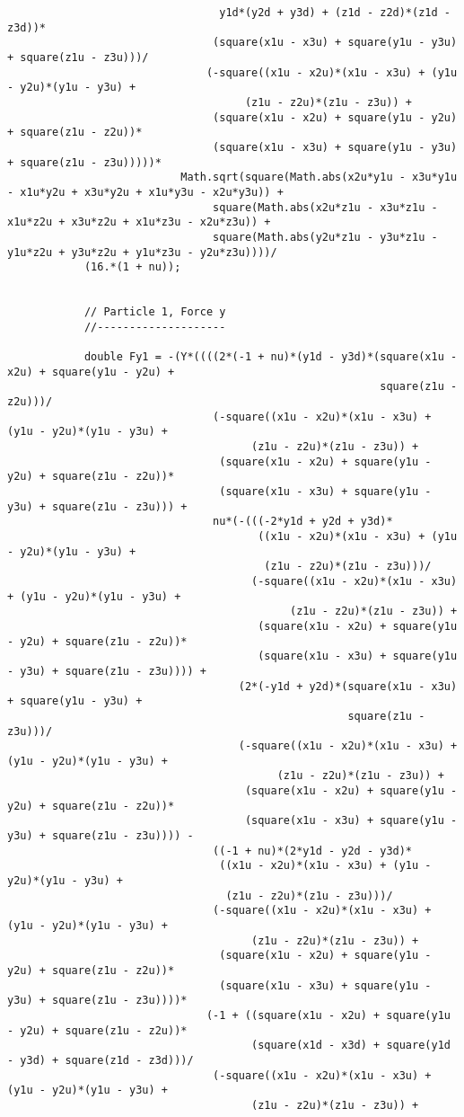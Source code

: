 \begin{lstlisting}
								 y1d*(y2d + y3d) + (z1d - z2d)*(z1d - z3d))*
								(square(x1u - x3u) + square(y1u - y3u) + square(z1u - z3u)))/
							   (-square((x1u - x2u)*(x1u - x3u) + (y1u - y2u)*(y1u - y3u) + 
									 (z1u - z2u)*(z1u - z3u)) + 
								(square(x1u - x2u) + square(y1u - y2u) + square(z1u - z2u))*
								(square(x1u - x3u) + square(y1u - y3u) + square(z1u - z3u)))))*
						   Math.sqrt(square(Math.abs(x2u*y1u - x3u*y1u - x1u*y2u + x3u*y2u + x1u*y3u - x2u*y3u)) + 
								square(Math.abs(x2u*z1u - x3u*z1u - x1u*z2u + x3u*z2u + x1u*z3u - x2u*z3u)) + 
								square(Math.abs(y2u*z1u - y3u*z1u - y1u*z2u + y3u*z2u + y1u*z3u - y2u*z3u))))/
			(16.*(1 + nu));
			
			
			// Particle 1, Force y
			//--------------------
			
			double Fy1 = -(Y*((((2*(-1 + nu)*(y1d - y3d)*(square(x1u - x2u) + square(y1u - y2u) + 
														  square(z1u - z2u)))/
								(-square((x1u - x2u)*(x1u - x3u) + (y1u - y2u)*(y1u - y3u) + 
									  (z1u - z2u)*(z1u - z3u)) + 
								 (square(x1u - x2u) + square(y1u - y2u) + square(z1u - z2u))*
								 (square(x1u - x3u) + square(y1u - y3u) + square(z1u - z3u))) + 
								nu*(-(((-2*y1d + y2d + y3d)*
									   ((x1u - x2u)*(x1u - x3u) + (y1u - y2u)*(y1u - y3u) + 
										(z1u - z2u)*(z1u - z3u)))/
									  (-square((x1u - x2u)*(x1u - x3u) + (y1u - y2u)*(y1u - y3u) + 
											(z1u - z2u)*(z1u - z3u)) + 
									   (square(x1u - x2u) + square(y1u - y2u) + square(z1u - z2u))*
									   (square(x1u - x3u) + square(y1u - y3u) + square(z1u - z3u)))) + 
									(2*(-y1d + y2d)*(square(x1u - x3u) + square(y1u - y3u) + 
													 square(z1u - z3u)))/
									(-square((x1u - x2u)*(x1u - x3u) + (y1u - y2u)*(y1u - y3u) + 
										  (z1u - z2u)*(z1u - z3u)) + 
									 (square(x1u - x2u) + square(y1u - y2u) + square(z1u - z2u))*
									 (square(x1u - x3u) + square(y1u - y3u) + square(z1u - z3u)))) - 
								((-1 + nu)*(2*y1d - y2d - y3d)*
								 ((x1u - x2u)*(x1u - x3u) + (y1u - y2u)*(y1u - y3u) + 
								  (z1u - z2u)*(z1u - z3u)))/
								(-square((x1u - x2u)*(x1u - x3u) + (y1u - y2u)*(y1u - y3u) + 
									  (z1u - z2u)*(z1u - z3u)) + 
								 (square(x1u - x2u) + square(y1u - y2u) + square(z1u - z2u))*
								 (square(x1u - x3u) + square(y1u - y3u) + square(z1u - z3u))))*
							   (-1 + ((square(x1u - x2u) + square(y1u - y2u) + square(z1u - z2u))*
									  (square(x1d - x3d) + square(y1d - y3d) + square(z1d - z3d)))/
								(-square((x1u - x2u)*(x1u - x3u) + (y1u - y2u)*(y1u - y3u) + 
									  (z1u - z2u)*(z1u - z3u)) + 

\end{lstlisting}

